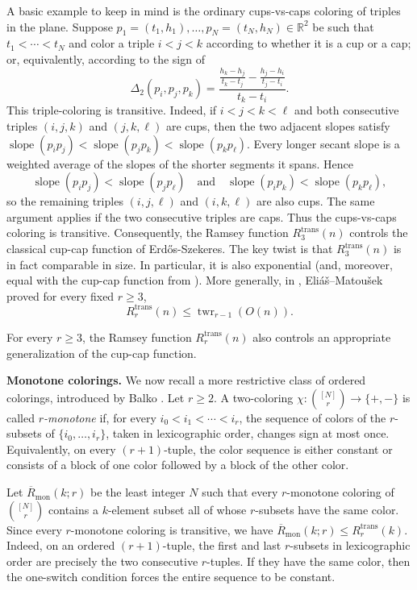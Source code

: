 \documentclass[11pt]{article}
\newcommand{\twr}{\operatorname{twr}}
\begin{document}
A basic example to keep in mind is the ordinary cups-vs-caps coloring of triples in the plane. Suppose $p_1=(t_1,h_1),\ldots,p_N=(t_N,h_N) \in \mathbb{R}^{2}$ be such that $ t_1<\cdots<t_N$ and color a triple $i<j<k$ according to whether it is a cup or a cap; or, equivalently, according to the sign of
\[
\Delta_2(p_i,p_j,p_k)
=
\frac{\frac{h_k-h_j}{t_k-t_j}-\frac{h_j-h_i}{t_j-t_i}}{t_k-t_i}.
\]
This triple-coloring is transitive. Indeed, if $i<j<k<\ell$ and both consecutive triples $(i,j,k)$ and $(j,k,\ell)$ are cups, then the two adjacent slopes satisfy $\operatorname{slope}(p_ip_j)<\operatorname{slope}(p_jp_k)<\operatorname{slope}(p_kp_\ell)$. Every longer secant slope is a weighted average of the slopes of the shorter segments it spans. Hence
\[
\operatorname{slope}(p_ip_j)<\operatorname{slope}(p_jp_\ell)
\quad\text{and}\quad
\operatorname{slope}(p_ip_k)<\operatorname{slope}(p_kp_\ell),
\]
so the remaining triples $(i,j,\ell)$ and $(i,k,\ell)$ are also cups. The same argument applies if the two consecutive triples are caps. Thus the cups-vs-caps coloring is transitive. Consequently, the Ramsey function  $R_3^{\mathrm{trans}}(n)$ controls the classical cup-cap function of Erd\H{o}s-Szekeres. The key twist is that $R_3^{\mathrm{trans}}(n)$ is in fact comparable in size. In particular, it is also exponential (and, moreover, equal with the cup-cap function from \cite{ES35}). More generally, in \cite[Theorem 1.4]{EM}, Eli\'a\v{s}--Matou\v{s}ek proved for every fixed $r\ge 3$,
\begin{equation} \label{EMblah}
R_r^{\mathrm{trans}}(n)\le \twr_{r-1}(O(n)).
\end{equation}

For every $r \geq 3$, the Ramsey function $R_r^{\mathrm{trans}}(n)$ also controls an appropriate generalization of the cup-cap function. 

\bigskip

\noindent\textbf{Monotone colorings.} We now recall a more restrictive class of
ordered colorings, introduced by Balko \cite{Balko}. Let $r\ge 2$. A two-coloring $\chi:\binom{[N]}{r}\to\{+,-\}$
is called \emph{$r$-monotone} if, for every $i_0<i_1<\cdots<i_r$, the sequence of colors of the $r$-subsets of $\{i_0,\ldots,i_r\}$, taken in
lexicographic order, changes sign at most once. Equivalently, on every $(r+1)$-tuple, the color sequence is either constant or consists of a block of one color followed by a block of the other color.

Let $\overline R_{\mathrm{mon}}(k;r)$ be the least integer $N$ such that every
$r$-monotone coloring of $\binom{[N]}{r}$ contains a $k$-element subset all of
whose $r$-subsets have the same color. Since every $r$-monotone coloring is
transitive, we have $\overline R_{\mathrm{mon}}(k;r)\le R_r^{\mathrm{trans}}(k)$. Indeed, on an ordered $(r+1)$-tuple, the first and last $r$-subsets in
lexicographic order are precisely the two consecutive $r$-tuples. If they have
the same color, then the one-switch condition forces the entire sequence to be
constant.
\end{document}
